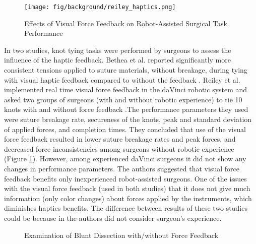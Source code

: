 \begin{figure}[h]
	\begin{center}
	\texttt{[image: fig/background/reiley\_haptics.png]}
	\end{center}
	\vspace{-4mm}
	\caption[Effects of Visual Force Feedback on Robot-Assisted Surgical Task Performance]
	{Effects of Visual Force Feedback on Robot-Assisted Surgical Task Performance \cite{reiley_effects_2008}}
	\label{fig:hapt_imp}
	\vspace{-2mm}
\end{figure}

In two studies, \cite{bethea_application_2004, reiley_effects_2008} knot tying tasks were performed by surgeons to assess the influence of the haptic feedback. Bethea et al. reported significantly more consistent tensions applied to suture materials, without breakage, during tying with visual haptic feedback compared to without the feedback \cite{bethea_application_2004}. Reiley et al. implemented real time visual force feedback in the daVinci robotic system and asked two groups of surgeons (with and without robotic experience) to tie 10 knots with and without force feedback \cite{reiley_effects_2008}
.The performance parameters they used were suture breakage rate, secureness of the knots, peak and standard deviation of applied forces, and completion times. They concluded that use of the visual force feedback resulted in lower suture breakage rates and peak forces, and decreased force inconsistencies among surgeons without robotic experience (Figure \ref{fig:hapt_imp}). However, among experienced daVinci surgeons it did not show any changes in performance parameters. The authors suggested that visual force feedback benefits only inexperienced robot-assisted surgeons. One of the issues with the visual force feedback (used in both studies) that it does not give much information (only color changes) about forces applied by the instruments, which diminishes haptics benefits. The difference between results of these two studies could be because in \cite{bethea_application_2004} the authors did not consider surgeon's experience.


\begin{figure}[h]%
\centering
{}%
\qquad
{}%
\qquad
{}%
\caption[Examination of Blunt Dissection with/without Force Feedback]{Examination of Blunt Dissection with/without Force Feedback \cite{wagner_benefit_2007}}
\label{fig:blant_dissect}%
\end{figure}

